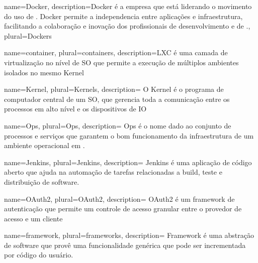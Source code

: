 
{
  name=Docker,
  description={Docker é a empresa que está liderando o movimento do uso de . Docker permite a independencia entre aplicações e infraestrutura, facilitando a colaboração e inovação dos profissionais de desenvolvimento e de .},
  plural=Dockers
}

{
  name=container,
  plural=containers,
  description={\gls{LXC} é uma camada de virtualização no nível de \gls{SO} que permite a execução de múltiplos ambientes isolados no mesmo \gls{Kernel}
  }
}

{
  name=Kernel,
  plural=Kernels,
  description={
    O Kernel é o programa de computador central de um \gls{SO}, que gerencia toda a comunicação entre os processos em alto nível e os dispositivos de \gls{IO}
  }
}

{
  name=Ops,
  plural=Ops,
  description={
    Ops é o nome dado ao conjunto de processos e serviços que garantem o bom funcionamento da infraestrutura de um ambiente operacional em .
  }
}

{
  name=Jenkins,
  plural=Jenkins,
  description={
    Jenkins é uma aplicação de código aberto que ajuda na automação de tarefas relacionadas a build, teste e distribuição de software.
  }
}

{
  name=OAuth2,
  plural=OAuth2,
  description={
    OAuth2 é um framework de autenticação que permite um controle de acesso granular entre o provedor de acesso e um cliente
  }
}

{
  name=framework,
  plural=frameworks,
  description={
    Framework é uma abstração de software que provê uma funcionalidade genérica que pode ser incrementada por código do usuário.
  }
}

